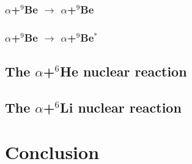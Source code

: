 \documentclass[
12pt, %
oneside, %
english, %
onehalfspacing, %
headsepline, %
]{MastersDoctoralThesis} %
\begin{document}
\subsection{$\alpha$+$^9$Be $\rightarrow$ $\alpha$+$^9$Be}
\subsection{$\alpha$+$^9$Be $\rightarrow$ $\alpha$+$^9$Be$^*$}

\section{The $\alpha$+$^6$He nuclear reaction}

\section{The $\alpha$+$^6$Li nuclear reaction}

\chapter{Conclusion}
% 
%
% 
% 


\appendix %



%
%


\printbibliography[heading=bibintoc]

\end{document}
